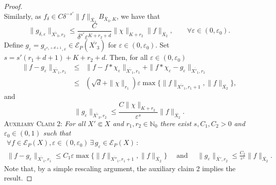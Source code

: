 \documentclass[12pt]{amsart}
\newcommand{\N}{\mathbb{N}}
\theoremstyle{definition}
\theoremstyle{remark}
\numberwithin{equation}{section}
\begin{document}
\begin{proof}
$$ $$
 Similarly, as $f_\delta \in C\delta^{-s'}  \|f\|_{\overline{X_2}}B_{\overline{X}_3,K}$, we have that
  $$
 \|  g_{\delta, \varepsilon}\|_{\overline{X'_3}, r_2}  \leq \frac{C}{\delta^{s'}\varepsilon^{K +r_2 + d}} \| \chi \|_{K + r_2}\|f\|_{\overline{X_2}}, \qquad \forall \varepsilon \in (0,\varepsilon_0).
 $$
 Define $g_\varepsilon =  g_{\varepsilon^{r_1+d + 1}, \varepsilon} \in \mathscr{E}_P(\overline{X'_3})$ for  $\varepsilon \in (0,\varepsilon_0)$. Set $s = s'(r_1 + d + 1) + K + r_2 + d$. Then, for all $\varepsilon \in (0,\varepsilon_0)$
 \begin{eqnarray*}
 \| f - g_\varepsilon\|_{\overline{X'_1}, r_1} &\leq& \| f -  f\ast \chi_\varepsilon\|_{\overline{X'_1}, r_1}
 + \| f \ast \chi_\varepsilon - g_\varepsilon\|_{\overline{X'_1}, r_1} \\
 &\leq&
 (\sqrt{d} + \| \chi\|_{r_1}) \varepsilon\max\{\|f\|_{\overline{X''_1}, r_1+1}, \|f\|_{\overline{X_2}}\},
 \end{eqnarray*}
 and
  $$
 \|  g_\varepsilon\|_{\overline{X'_3}, r_2} \leq \frac{C \| \chi\|_{K +r_2} }{\varepsilon^s}\|f\|_{\overline{X_2}}.
 $$
 	\textsc{Auxiliary Claim 2:} \emph{For all $X' \Subset X$ and  $r_1,r_2\in\N_0$  there exist $s, C_1,C_2>0$ and $\varepsilon_0 \in (0,1)$ such that 
 		\begin{gather*}
 			\forall f\in\mathscr{E}_P(X), \varepsilon\in (0,\varepsilon_0) \,\exists\,g_\varepsilon \in\mathscr{E}_P(X)\,: \\
 			\|f-g_\varepsilon\|_{\overline{X'_1},r_1}\leq C_1\varepsilon\max\{\|f\|_{\overline{X''_1}, r_1+1}, \|f\|_{\overline{X_2}}\} \quad
 			\mbox{ and } \quad \|g_\varepsilon\|_{\overline{X'},r_2}\leq\frac{C_2}{\varepsilon^s}\|f\|_{\overline{X_2}}.
 		\end{gather*}
 	}
\noindent Note that, by a simple rescaling argument, the auxiliary claim 2 implies the result.  


\end{proof}
\end{document}
